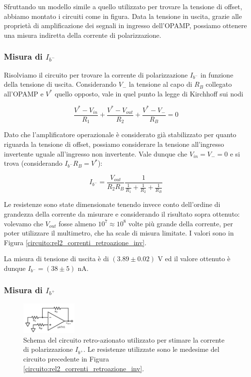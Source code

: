 Sfruttando un modello simile a quello utilizzato per trovare la tensione di offset, abbiamo montato i circuiti come in figura. Data la tensione in uscita, grazie alle proprietà di amplificazione dei segnali in ingresso dell'OPAMP, possiamo ottenere una misura indiretta della corrente di polarizzazione.

\subsubsection*{Misura di $I_{b^-}$}

Risolviamo il circuito per trovare la corrente di polarizzazione $I_{b^-}$ in funzione della tensione di uscita. Considerando $V_{-}$ la tensione al capo di $R_B$ collegato all'OPAMP e $V^*$ quello opposto, vale in quel punto la legge di Kirchhoff sui nodi

$$\frac{V^* - V_{in}}{R_1} + \frac{V^*-V_{out}}{R_2} + \frac{V^*-V_{-}}{R_B}=0$$

Dato che l'amplificatore operazionale è considerato già stabilizzato per quanto riguarda la tensione di offset, possiamo considerare la tensione all'ingresso invertente uguale all'ingresso non invertente. Vale dunque che $V_{in}=V_{-}=0$ e si trova (considerando $I_{b^-} R_B = V^*$):

$$I_{b^-}=\frac{V_{out}}{R_2 R_B}\frac{1}{\frac{1}{R_1}+\frac{1}{R_2}+\frac{1}{R_B}}$$

Le resistenze sono state dimensionate tenendo invece conto dell'ordine di grandezza della corrente da misurare e considerando il risultato sopra ottenuto: volevamo che $V_{out}$ fosse almeno $10^7\approx10^8$ volte più grande della corrente, per poter utilizzare il multimetro, che ha scale di misura limitate. I valori sono in Figura \ref{circuito:rel2_correnti_retroazione_inv}.

La misura di tensione di uscita è di $(3.89\pm0.02)$ \si{\volt} ed il valore ottenuto è dunque $I_{b^-} = (38 \pm 5)$ \si{\nano\ampere}.

\subsubsection*{Misura di $I_{b^+}$}

\begin{figure}
  \begin{center}
    \includegraphics[width=0.25\textwidth]{../E02/latex/ninv_current.pdf}
  \end{center}
  \caption{Schema del circuito retro-azionato utilizzato per stimare la corrente di polarizzazione $I_{b^+}$. Le resistenze utilizzate sono le medesime del circuito precedente in Figura \ref{circuito:rel2_correnti_retroazione_inv}.}
  \label{circuito:rel2_correnti_retroazione_noninv}
\end{figure}

